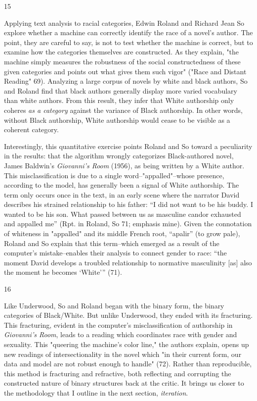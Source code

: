 \documentclass[11pt]{article}
\begin{document}
15

Applying text analysis to racial categories, Edwin Roland and Richard
Jean So explore whether a machine can correctly identify the race of a
novel's author. The point, they are careful to say, is not to test
whether the machine is correct, but to examine how the categories
themselves are constructed. As they explain, "the machine simply
measures the robustness of the social constructedness of these given
categories and points out what gives them such vigor" ("Race and
Distant Reading" 69). Analyzing a large corpus of novels by white and
black authors, So and Roland find that black authors generally display
more varied vocabulary than white authors. From this result, they
infer that White authorship only coheres \emph{as a category} against the
variance of Black authorship. In other words, without Black
authorship, White authorship would cease to be visible as a coherent
category.

Interestingly, this quantitative exercise points Roland and So toward
a peculiarity in the results: that the algorithm wrongly categorizes
Black-authored novel, James Baldwin's \emph{Giovanni’s Room} (1956), as
being written by a White author. This misclassification is due to a
single word--"appalled"--whose presence, according to the model, has
generally been a signal of White authorship. The term only occurs once
in the text, in an early scene where the narrator David describes his
strained relationship to his father: “I did not want to be his buddy.
I wanted to be his son. What passed between us as masculine candor
exhausted and appalled me” (Rpt. in Roland, So 71; emphasis mine).
Given the connotation of whiteness in "appalled" and its middle French
root, “apalir” (to grow pale), Roland and So explain that this
term--which emerged as a result of the computer's mistake--enables
their analysis to connect gender to race: “the moment David develops a
troubled relationship to normative masculinity [as] also the moment he
becomes ‘White’” (71).

16

Like Underwood, So and Roland began with the binary form, the binary
categories of Black/White. But unlike Underwood, they ended with its
fracturing. This fracturing, evident in the computer's
misclassification of authorship in \emph{Giovanni's Room}, leads to a
reading which coordinates race with gender and sexuality. This
"queering the machine’s color line," the authors explain, opens up new
readings of intersectionality in the novel which "in their current
form, our data and model are not robust enough to handle" (72). Rather
than reproducible, this method is fracturing and refractive, both
reflecting and corrupting the constructed nature of binary structures
back at the critic. It brings us closer to the methodology that I
outline in the next section, \emph{iteration}.
\end{document}
